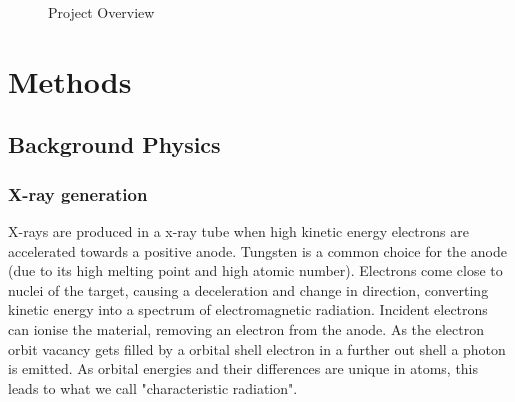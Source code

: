\documentclass{article}
\theoremstyle{definition}
\begin{document}
\begin{figure}[H]
\centering
{}
\caption{Project Overview}
\label{fig:pipeline}
\end{figure}

\section{Methods}

\subsection{Background Physics}
\subsubsection{X-ray generation}
X-rays are produced in  a x-ray tube when high kinetic energy electrons are accelerated towards a positive anode. Tungsten is a common choice for the anode (due to its high melting point and high atomic number). Electrons come close to nuclei of the target, causing a deceleration and change in direction, converting kinetic energy into a spectrum of electromagnetic radiation. Incident electrons can ionise the material, removing an electron from the anode. As the electron orbit vacancy gets filled by a orbital shell electron in a further out shell a photon is emitted. As orbital energies and their differences are unique in atoms, this leads to what we call "characteristic radiation".
\cite{Tafti2023}
\end{document}

